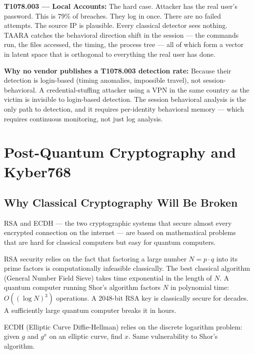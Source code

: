 \documentclass[11pt,a4paper]{article}
\begin{document}
\textbf{T1078.003 — Local Accounts:} The hard case. Attacker has the real user's password. This is 79\% of breaches. They log in once. There are no failed attempts. The source IP is plausible. Every classical detector sees nothing. TAARA catches the behavioral direction shift in the session — the commands run, the files accessed, the timing, the process tree — all of which form a vector in latent space that is orthogonal to everything the real user has done.

\textbf{Why no vendor publishes a T1078.003 detection rate:} Because their detection is login-based (timing anomalies, impossible travel), not session-behavioral. A credential-stuffing attacker using a VPN in the same country as the victim is invisible to login-based detection. The session behavioral analysis is the only path to detection, and it requires per-identity behavioral memory — which requires continuous monitoring, not just log analysis.

\section{Post-Quantum Cryptography and Kyber768}

\subsection{Why Classical Cryptography Will Be Broken}

RSA and ECDH — the two cryptographic systems that secure almost every encrypted connection on the internet — are based on mathematical problems that are hard for classical computers but easy for quantum computers.

RSA security relies on the fact that factoring a large number $N = p \cdot q$ into its prime factors is computationally infeasible classically. The best classical algorithm (General Number Field Sieve) takes time exponential in the length of $N$. A quantum computer running Shor's algorithm factors $N$ in polynomial time: $O((\log N)^3)$ operations. A 2048-bit RSA key is classically secure for decades. A sufficiently large quantum computer breaks it in hours.

ECDH (Elliptic Curve Diffie-Hellman) relies on the discrete logarithm problem: given $g$ and $g^x$ on an elliptic curve, find $x$. Same vulnerability to Shor's algorithm.
\end{document}
